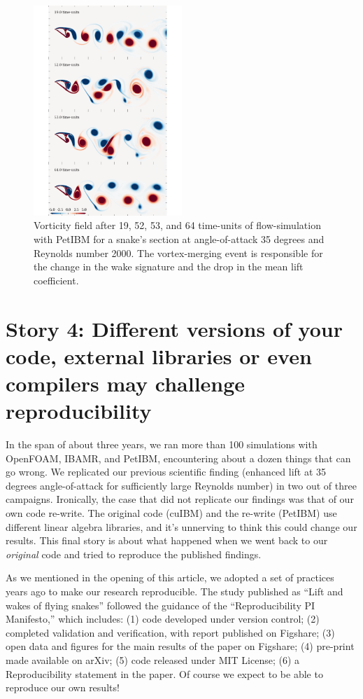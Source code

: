 \documentclass[9pt,twocolumn,twoside]{article}
\begin{document}
\begin{figure}[t]
\centering
\includegraphics[width=0.5\textwidth]{./figures/petibm011_vorticityRe2000AoA35.pdf}
\caption{
Vorticity field after 19, 52, 53, and 64 time-units of flow-simulation with PetIBM for a snake's section at angle-of-attack 35 degrees and Reynolds number 2000.
The vortex-merging event is responsible for the change in the wake signature and the drop in the mean lift coefficient.}
\label{figure10}
\end{figure}



\section*{Story 4: Different versions of your code, external libraries or even compilers may challenge reproducibility}

In the span of about three years, we ran more than 100 simulations with OpenFOAM, IBAMR, and PetIBM, encountering about a dozen things that can go wrong. 
We replicated our previous scientific finding (enhanced lift at 35 degrees angle-of-attack for sufficiently large Reynolds number) in two out of three campaigns. 
Ironically, the case that did not replicate our findings was that of our own code re-write. 
The original code (cuIBM) and the re-write (PetIBM) use different linear algebra libraries, and it's unnerving to think this could change our results. 
This final story is about what happened when we went back to our \textit{original} code and tried to reproduce the published findings.

As we mentioned in the opening of this article, we adopted a set of practices years ago to make our research reproducible. 
The study published as ``Lift and wakes of flying snakes'' followed the guidance of the ``Reproducibility PI Manifesto,'' 
which includes: 
(1) code developed under version control; 
(2) completed validation and verification, with report published on Figshare; 
(3) open data and figures for the main results of the paper on Figshare; 
(4) pre-print made available on arXiv; 
(5) code released under MIT License; 
(6) a Reproducibility statement in the paper.
Of course we expect to be able to reproduce our own results!
\end{document}
